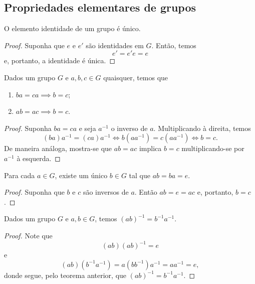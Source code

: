 \subsection*{Propriedades elementares de grupos}
%
\begin{theorem}
\label{teo-unicidade-ident}
    O elemento identidade de um grupo é único.
\end{theorem}
%
\begin{proof}
    Suponha que $e$ e $e'$ são identidades em $G$. Então, temos
    \[
    e' = e'e = e
    \]
    e, portanto, a identidade é única.
\end{proof}
%
\begin{theorem}
\label{teo-cancelamento}
    Dados um grupo $G$ e $a,b,c\in G$ quaisquer, temos que
    \begin{enumerate}
        \item $ba = ca \implies b = c$;
        \item $ab = ac \implies b = c$.
    \end{enumerate}
\end{theorem}
%
\begin{proof}
    Suponha $ba = ca$ e seja $a^{-1}$ o inverso de $a$. Multiplicando à direita, temos
    \[
    (ba)a^{-1} = (ca)a^{-1} \iff b(aa^{-1}) = c(aa^{-1}) \iff b = c. 
    \]
    De maneira análoga, mostra-se que $ab = ac$ implica $b=c$ multiplicando-se por $a^{-1}$ à esquerda.
\end{proof}
%
\begin{theorem}
\label{teo-unicidade-inv}
    Para cada $a\in G$, existe um único $b\in G$ tal que $ab = ba = e$.
\end{theorem}
%
\begin{proof}
    Suponha que $b$ e $c$ são inversos de $a$. Então $ab = e = ac$ e, portanto, $b = c$.
\end{proof}
%
\begin{theorem}
\label{teo-inv-prod}
    Dados um grupo $G$ e $a,b\in G$, temos $(ab)^{-1} = b^{-1}a^{-1}$.
\end{theorem}
%
\begin{proof}
    Note que
    \[
    (ab)(ab)^{-1} = e
    \]
    e
    \[
    (ab)(b^{-1}a^{-1}) = a(bb^{-1})a^{-1} = aa^{-1} = e,
    \]
    donde segue, pelo teorema anterior, que $(ab)^{-1} = b^{-1}a^{-1}$.
\end{proof}
%
